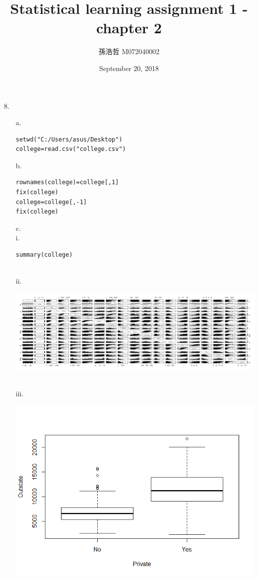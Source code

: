\documentclass[12pt]{article}
\title{Statistical learning assignment 1 - chapter 2}
\author{孫浩哲 \hspace{0.7cm} M072040002}
\date{September 20, 2018}
\begin{document}
\maketitle
\Large{8.}
\begin{itemize}
\item[a.]
\begin{verbatim}
setwd("C:/Users/asus/Desktop")
college=read.csv("college.csv")
\end{verbatim}
\item[b.]
\begin{verbatim}
rownames(college)=college[,1]
fix(college)
college=college[,-1]
fix(college)
\end{verbatim}
\item[c.]
\ \\[0.5ex]
i.\begin{verbatim}
summary(college)
\end{verbatim}
\ \\[50ex]
ii.\\[2ex]
\centerline{\includegraphics[width=1.3\linewidth]{Rplot}}\\[2ex]
iii.\\
\centerline{\includegraphics[width=1\linewidth]{box}}

\end{itemize}
\end{document}
